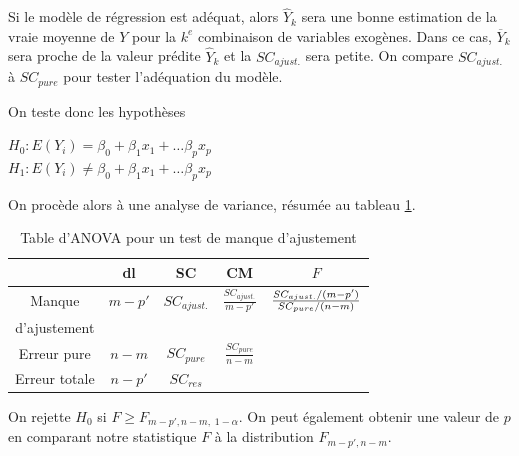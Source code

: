 

Si le modèle de régression est adéquat, alors $\hat{Y}_k$ sera une bonne estimation de la vraie moyenne de $Y$ pour la $k^e$ combinaison de variables exogènes. Dans ce cas, $\overline{Y}_k$ sera proche de la valeur prédite $\hat{Y}_k$ et la $SC_{ajust.}$ sera petite. On compare $SC_{ajust.}$ à $SC_{pure}$ pour tester l'adéquation du modèle.

On teste donc les hypothèses

$H_0 : E(Y_i) = \beta_0 + \beta_1 x_1 + \ldots \beta_p x_p$ \\
$H_1 : E(Y_i) \ne \beta_0 + \beta_1 x_1 + \ldots \beta_p x_p$

On procède alors à une analyse de variance, résumée au tableau \ref{tab:anovaLOF}.

\begin{table}[H]
\centering
\begin{tabular}{|c||c|c|c|c|}\hline\
 & dl & SC & CM & $F$  \\ \hline\hline
 Manque &  $m-p'$ & $SC_{ajust.}$ &    $\frac{SC_{ajust.}}{m-p'}$  &     ${SC_{ajust.}/(m-p')\over SC_{pure}/(n-m)}$   \\
 d'ajustement & & & &  \\
 Erreur pure  & $n-m$ & $SC_{pure}$ &   $\frac{SC_{pure}}{n-m}$  & \\
 Erreur totale & $n-p'$ & $SC_{res}$ &    &  \\ \hline
\end{tabular}
\caption{Table d'ANOVA pour un test de manque d'ajustement}
\label{tab:anovaLOF}
\end{table}

On rejette $H_0$ si  $F \ge F_{m-p',n-m,\;1-\alpha}$. On peut également obtenir une valeur de $p$ en comparant notre statistique $F$ à la distribution $F_{m-p',n-m}$.

